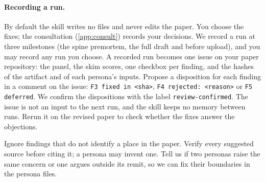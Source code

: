 \paragraph{Recording a run.} By default the skill writes no files and never edits the paper. You choose the fixes; the consultation (\cref{app:consult}) records your decisions. We record a run at three milestones (the spine premortem, the full draft and before upload), and you may record any run you choose. A recorded run becomes one issue on your paper repository: the panel, the skim scores, one checkbox per finding, and the hashes of the artifact and of each persona's inputs. Propose a disposition for each finding in a comment on the issue: \texttt{F3 fixed in <sha>}, \texttt{F4 rejected: <reason>} or \texttt{F5 deferred}. We confirm the dispositions with the label \texttt{review-confirmed}. The issue is not an input to the next run, and the skill keeps no memory between runs. Rerun it on the revised paper to check whether the fixes answer the objections.

Ignore findings that do not identify a place in the paper. Verify every suggested source before citing it; a persona may invent one. Tell us if two personas raise the same concern or one argues outside its remit, so we can fix their boundaries in the persona files.

